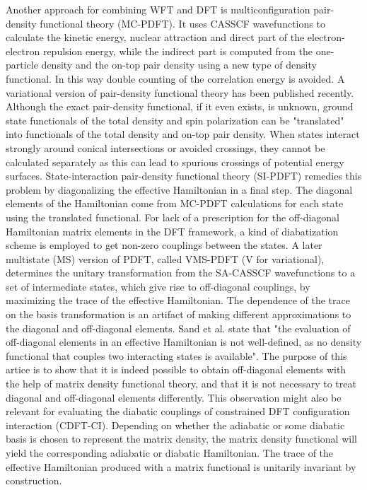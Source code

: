 \documentclass[journal=jacsat,manuscript=article]{achemso}
\begin{document}
Another approach for combining WFT and DFT is multiconfiguration pair-density functional theory (MC-PDFT). \cite{LiManni2014}
It uses CASSCF wavefunctions to calculate the kinetic energy, nuclear attraction and direct part of the electron-electron
repulsion energy, while the indirect part is computed from the one-particle density and the on-top pair density using
a new type of density functional. In this way double counting of the correlation energy is avoided.
A variational version of pair-density functional theory has been published recently. \cite{Scott2024}
Although the exact pair-density functional,
if it even exists, is unknown, ground state functionals of the total density and spin polarization can be "translated"
into functionals of the total density and on-top pair density. \cite{LiManni2014}
When states interact strongly around conical intersections or avoided crossings, they cannot be calculated separately as
this can lead to spurious crossings of potential energy surfaces. \cite{Sand2018state}
State-interaction pair-density functional theory (SI-PDFT)
\cite{Sand2018state} remedies this problem by diagonalizing the effective Hamiltonian in a final step.
The diagonal elements of the Hamiltonian come from 
MC-PDFT calculations for each state using the translated functional. 
For lack of a prescription for the off-diagonal Hamiltonian matrix elements in the DFT framework, a kind of diabatization
scheme is employed to get non-zero couplings between the states. \cite{Sand2018state}
A later multistate (MS) version of PDFT, called VMS-PDFT (V for variational), determines the unitary transformation
from the SA-CASSCF wavefunctions to a set of intermediate states, which give rise to off-diagonal couplings,
by maximizing the trace of the effective Hamiltonian. \cite{Bao2020multi} The dependence of the trace on the basis transformation
is an artifact of making different approximations to the diagonal and off-diagonal elements.
Sand et al. state that "the evaluation of off-diagonal elements in an effective Hamiltonian is not well-defined,
as no density functional that couples two interacting states is available". \cite{Sand2018state}
The purpose of this artice is to show
that it is indeed possible to obtain off-diagonal elements with the help of
matrix density functional theory, and that it is not necessary to treat diagonal and off-diagonal elements differently.
This observation might also be relevant for evaluating the diabatic couplings
of constrained DFT configuration interaction (CDFT-CI)\cite{Wu2007configuration}.
Depending on whether the adiabatic or some diabatic basis is chosen to represent the matrix density,
the matrix density functional will yield the corresponding adiabatic or diabatic Hamiltonian.
The trace of the effective Hamiltonian produced with a matrix functional is unitarily invariant by construction.
\end{document}
